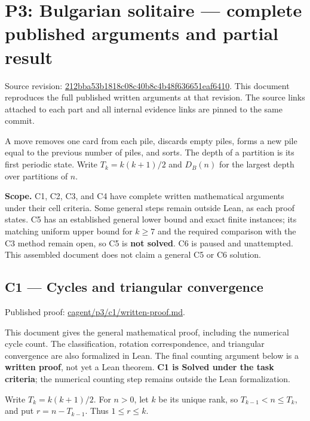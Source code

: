 \documentclass[11pt,a4paper]{article}
\begin{document}
\section{P3: Bulgarian solitaire --- complete published arguments and partial result}\label{p3-bulgarian-solitaire-complete-published-arguments-and-partial-result}

Source revision: \href{https://github.com/mpelteshki/climbing-to-the-frontier/tree/212bba53b1818c08c40b8c4b48f636651eaf6410/cagent/p3}{212bba53b1818c08c40b8c4b48f636651eaf6410}. This document reproduces the full published written arguments at that revision. The source links attached to each part and all internal evidence links are pinned to the same commit.

A move removes one card from each pile, discards empty piles, forms a new pile equal to the previous number of piles, and sorts. The depth of a partition is its first periodic state. Write \(T_k=k(k+1)/2\) and \(D_B(n)\) for the largest depth over partitions of \(n\).

\textbf{Scope.} C1, C2, C3, and C4 have complete written mathematical arguments under their cell criteria. Some general steps remain outside Lean, as each proof states. C5 has an established general lower bound and exact finite instances; its matching uniform upper bound for \(k\ge7\) and the required comparison with the C3 method remain open, so C5 is \textbf{not solved}. C6 is paused and unattempted. This assembled document does not claim a general C5 or C6 solution.

\subsection{C1 --- Cycles and triangular convergence}\label{c1-cycles-and-triangular-convergence}

Published proof: \href{https://github.com/mpelteshki/climbing-to-the-frontier/blob/212bba53b1818c08c40b8c4b48f636651eaf6410/cagent/p3/c1/written-proof.md}{cagent/p3/c1/written-proof.md}.

This document gives the general mathematical proof, including the numerical cycle count. The classification, rotation correspondence, and triangular convergence are also formalized in Lean. The final counting argument below is a \textbf{written proof}, not yet a Lean theorem. \textbf{C1 is Solved under the task criteria}; the numerical counting step remains outside the Lean formalization.

Write \(T_k=k(k+1)/2\). For \(n>0\), let \(k\) be its unique rank, so \(T_{k-1}<n\le T_k\), and put \(r=n-T_{k-1}\). Thus \(1\le r\le k\).
\end{document}
